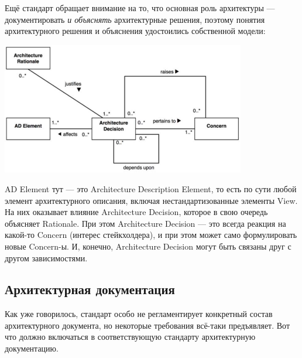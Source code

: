 \documentclass{../mcstext}
\begin{document}
Ещё стандарт обращает внимание на то, что основная роль архитектуры --- документировать \emph{и объяснять} архитектурные решения, поэтому понятия архитектурного решения и объяснения удостоились собственной модели:

\begin{center}
    \includegraphics[width=0.8\textwidth]{ieee42010Decision.png}
\end{center}

AD Element тут --- это Architecture Description Element, то есть по сути любой элемент архитектурного описания, включая нестандартизованные элементы View. На них оказывает влияние Architecture Decision, которое в свою очередь объясняет Rationale. При этом Architecture Decision --- это всегда реакция на какой-то Concern (интерес стейкхолдера), и при этом может само формулировать новые Concern-ы. И, конечно, Architecture Decision могут быть связаны друг с другом зависимостями.

\subsection{Архитектурная документация}

Как уже говорилось, стандарт особо не регламентирует конкретный состав архитектурного документа, но некоторые требования всё-таки предъявляет. Вот что должно включаться в соответствующую стандарту архитектурную документацию.
\end{document}
